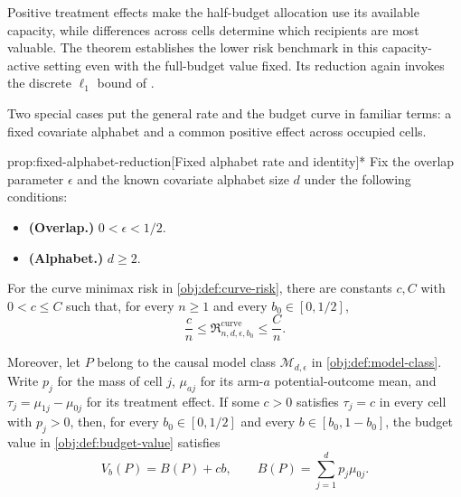 \documentclass[11pt]{article}
\begin{document}
Positive treatment effects make the half-budget allocation use its available capacity, while differences across cells determine which recipients are most valuable. The theorem establishes the lower risk benchmark in this capacity-active setting even with the full-budget value fixed. Its reduction again invokes the discrete \(\ell_1\) bound of \citet[Theorem~3 and the unknown-both-distributions reduction following Theorem~6]{JiaoHanWeissman2018}.

Two special cases put the general rate and the budget curve in familiar terms: a fixed covariate alphabet and a common positive effect across occupied cells.

\begin{propositionv}{prop:fixed-alphabet-reduction}[Fixed alphabet rate and identity]*
Fix the overlap parameter \(\epsilon\) and the known covariate alphabet size \(d\) under the following conditions:
\begin{itemize}
\item \textbf{(Overlap.)} \(0<\epsilon<1/2\).
\item \textbf{(Alphabet.)} \(d\ge 2\).
\end{itemize}
For the curve minimax risk in \cref{obj:def:curve-risk}, there are constants \(c,C\) with \(0<c\le C\) such that, for every \(n\ge1\) and every \(b_0\in[0,1/2]\),
\[
\frac{c}{n}\le
\mathfrak R_{n,d,\epsilon,b_0}^{\mathrm{curve}}
\le\frac{C}{n}.
\]

Moreover, let \(P\) belong to the causal model class \(\mathcal M_{d,\epsilon}\) in \cref{obj:def:model-class}. Write \(p_j\) for the mass of cell \(j\), \(\mu_{aj}\) for its arm-\(a\) potential-outcome mean, and \(\tau_j=\mu_{1j}-\mu_{0j}\) for its treatment effect. If some \(c>0\) satisfies \(\tau_j=c\) in every cell with \(p_j>0\), then, for every \(b_0\in[0,1/2]\) and every \(b\in[b_0,1-b_0]\), the budget value in \cref{obj:def:budget-value} satisfies
\[
V_b(P)=B(P)+cb,
\qquad
B(P)=\sum_{j=1}^{d}p_j\mu_{0j}.
\]
\end{propositionv}
\end{document}
